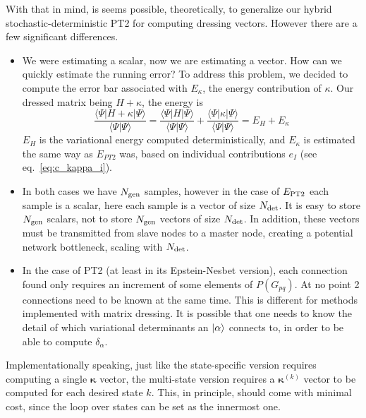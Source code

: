 \documentclass[./thesis.tex]{subfiles}
\begin{document}
With that in mind, is seems possible, theoretically, to generalize our hybrid stochastic-deterministic PT2 for computing dressing vectors.
However there are a few significant differences.
\begin{itemize}
\item
We were estimating a scalar, now we are estimating a vector. How can we quickly estimate the running error?
To address this problem, we decided to compute the error bar associated with $E_{\kappa}$, the energy contribution of $\kappa$. Our dressed matrix being $H + \kappa$, the energy is
\begin{equation}
\frac{\langle \Psi |H + \kappa | \Psi\rangle}{\langle \Psi | \Psi \rangle} = \frac{\langle \Psi |H  | \Psi\rangle}{\langle \Psi | \Psi \rangle} + \frac{\langle \Psi |\kappa | \Psi\rangle}{\langle \Psi | \Psi \rangle} = E_H + E_{\kappa} 
\end{equation}
$E_H$ is the variational energy computed deterministically, and $E_{\kappa}$ is estimated the same way as $E_{PT2}$ was, based on individual contributions $e_I$ (see eq.~\eqref{eq:c_kappa_i}).
\item
In both cases we have ${N_\text{gen}}$ samples, however in the case of $E_\text{PT2}$ each sample is a scalar, here each sample is a vector of size ${N_\text{det}}$. It is easy to store ${N_\text{gen}}$ scalars, not to store ${N_\text{gen}}$ vectors of size ${N_\text{det}}$. In addition, these vectors must be transmitted from slave nodes to a master node, creating a potential network bottleneck, scaling with ${N_\text{det}}$.
\item
In the case of PT2 (at least in its Epstein-Nesbet version), each connection found only requires an increment of some elements of $P(G_{pq})$. At no point 2 connections need to be known at the same time. This is different for methods implemented with matrix dressing. It is possible that one needs to know the detail of which variational determinants an $\ket \alpha$ connects to, in order to be able to compute $\delta_\alpha$.
\end{itemize}



Implementationally speaking, just like the state-specific version requires computing a single ${\pmb \kappa}$ vector, the multi-state version requires a ${\pmb \kappa}^{(k)}$ vector to be computed for each desired state $k$. This, in principle, should come with minimal cost, since the loop over states can be set as the innermost one. 


\end{document}
